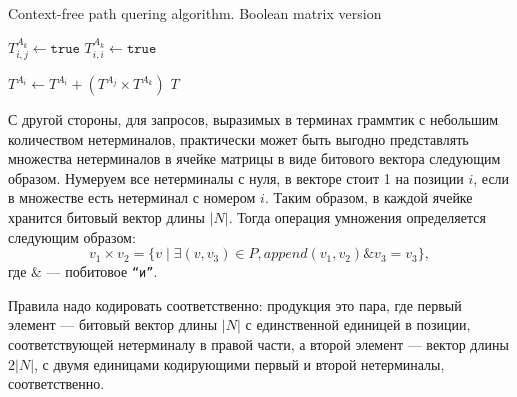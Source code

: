 \begin{algorithm}
\begin{algorithmic}[1]
\caption{Context-free path quering algorithm. Boolean matrix version}
\label{lst:algo1}
          {$T^{A_k}_{i,j} \gets \texttt{true}$}
    \EndFor
       {$T^{A_k}_{i,i} \gets \texttt{true}$}
    \EndFor

          { $T^{A_i} \gets T^{A_i} + (T^{A_j} \times T^{A_k})$ }
        \EndFor
    \EndWhile
\State \Return $T$
\EndFunction
\end{algorithmic}
\end{algorithm}

С другой стороны, для запросов, выразимых в терминах граммтик с небольшим количеством нетерминалов, практически может быть выгодно представлять множества нетерминалов в ячейке матрицы в виде битового вектора следующим образом.
Нумеруем все нетерминалы с нуля, в векторе стоит 1 на позиции $i$, если в множестве есть нетерминал с номером $i$.
Таким образом, в каждой ячейке хранится битовый вектор длины $|N|$.
Тогда операция умножения определяется следующим образом:
$$v_1 \times v_2 = \{v \mid \exists (v,v_3) \in P, \textit{append}(v_1, v_2) \& v_3 = v_3\},$$ где $\&$ --- побитовое \texttt{``и''}.

Правила надо кодировать соответственно: продукция это пара, где первый элемент --- битовый вектор длины $|N|$ с единственной единицей в позиции, соответствующей нетерминалу в правой части, а второй элемент --- вектор длины $2|N|$, с двумя единицами кодирующими первый и второй нетерминалы, соответственно.


